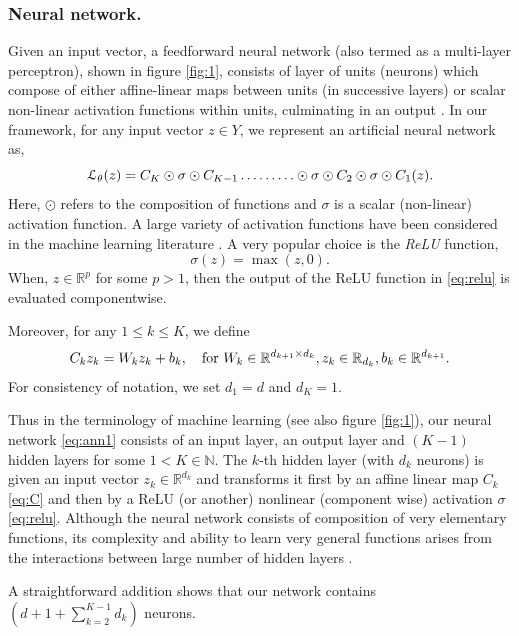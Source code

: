 \documentclass[a4paper]{article}
\numberwithin{equation}{section}
\numberwithin{equation}{section}
\theoremstyle{definition}
\theoremstyle{myremarkstyle}
\renewcommand{\leq}{\leqslant}
\newcommand{\R}{\mathbb{R}}
\newcommand{\N}{\mathbb{N}}
\newcommand{\map}{\EuScript{L}}
\begin{document}
\subsubsection{Neural network.} 
\label{sec:NN}
Given an input vector, a feedforward neural network (also termed as a multi-layer perceptron), shown in figure \ref{fig:1}, consists of layer of units (neurons) which compose of either affine-linear maps between units (in successive layers) or scalar non-linear activation functions within units, culminating in an output \cite{DLbook}. In our framework, for any input vector $z \in Y$, we represent an artificial neural network as,
\begin{equation}
\label{eq:ann1}
\map_{\theta}(z) = C_K \odot\sigma \odot C_{K-1}\ldots \ldots \ldots \odot\sigma \odot C_2 \odot \sigma \odot C_1(z).
\end{equation} 
Here, $\odot$ refers to the composition of functions and $\sigma$ is a scalar (non-linear) activation function. A large variety of activation functions have been considered in the machine learning literature \cite{DLbook}. A very popular choice is the \emph{ReLU} function,
\begin{equation}
\label{eq:relu}
\sigma(z) = \max(z,0).
\end{equation}
When, $z \in \R^p$ for some $p > 1$, then the output of the ReLU function in \eqref{eq:relu} is evaluated componentwise. 

Moreover, for any $1 \leq k \leq K$, we define
\begin{equation}
\label{eq:C}
C_k z_k = W_k z_k + b_k, \quad {\rm for} ~ W_k \in \R^{d_{k+1} \times d_k}, z_k \in \R_{d_k}, b_k \in \R^{d_{k+1}}.
\end{equation}
For consistency of notation, we set $d_1 = d$ and $d_K = 1$. 

Thus in the terminology of machine learning (see also figure \ref{fig:1}), our neural network \eqref{eq:ann1} consists of an input layer, an output layer and $(K-1)$ hidden layers for some $1 < K \in \N$. The $k$-th hidden layer (with $d_k$ neurons) is given an input vector $z_k \in \R^{d_k}$ and transforms it first by an affine linear map $C_k$ \eqref{eq:C} and then by a ReLU (or another) nonlinear (component wise) activation $\sigma$ \eqref{eq:relu}. Although the neural network consists of composition of very elementary functions, its complexity and ability to learn very general functions arises from the interactions between large number of hidden layers \cite{DLbook}.  

A straightforward addition shows that our network contains $\left(d + 1 + \sum\limits_{k=2}^{K-1} d_k\right)$ neurons. 
\end{document}
